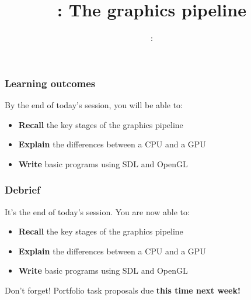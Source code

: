 \usepackage{../../beamerthemeFalmouthGamesAcademy}
\usepackage{multimedia}
\graphicspath{ {../../} }


\usepackage[normalem]{ulem}
\usepackage{wasysym}

\usepackage{pdfpages}

\usetikzlibrary{arrows,automata}




\title{\sessionnumber: The graphics pipeline}
\subtitle{\modulecode: \moduletitle}

\frame{\titlepage} 

\begin{frame}
	\frametitle{Learning outcomes}
	By the end of today's session, you will be able to:
	\begin{itemize}
		\item \textbf{Recall} the key stages of the graphics pipeline
		\item \textbf{Explain} the differences between a CPU and a GPU
		\item \textbf{Write} basic programs using SDL and OpenGL
	\end{itemize}
\end{frame}









\begin{frame}
	\frametitle{Debrief}
	It's the end of today's session. You are now able to:
	\begin{itemize}
		\item \textbf{Recall} the key stages of the graphics pipeline
		\item \textbf{Explain} the differences between a CPU and a GPU
		\item \textbf{Write} basic programs using SDL and OpenGL
	\end{itemize}
	Don't forget! Portfolio task proposals due \textbf{this time next week!}
\end{frame}



